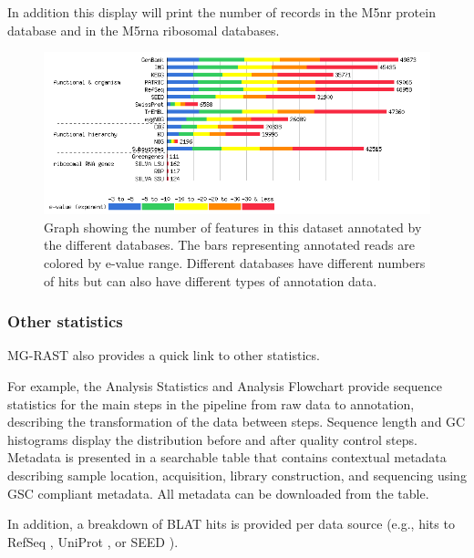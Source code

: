 \documentclass[12pt,fullpage]{report}
\begin{document}
In addition this display will print the number of records in the M5nr protein database and in the M5rna ribosomal databases. 

\begin{figure}
\begin{center}
\includegraphics[width=6in]{Images/source-hits-distribution.png}
\end{center}
\caption{Graph showing the number of features in this dataset annotated by the different databases.
 The bars representing annotated reads are colored by e-value range. Different databases have different numbers of hits but can also have different types of annotation data.}
\label{fig:source-hits-distribution}
\end{figure}
\subsubsection{Other statistics }

MG-RAST also provides a quick link to other statistics.

\noindent For example, the Analysis Statistics and Analysis Flowchart provide sequence statistics for the main steps in the pipeline from raw data to annotation, describing the transformation of the data between steps.
Sequence length and GC histograms display the distribution before and after quality control steps.
Metadata is presented in a searchable table that contains contextual metadata describing sample location, acquisition, library construction, and sequencing using GSC compliant metadata. All metadata can be downloaded from the table.

In addition, 
a breakdown of BLAT hits is provided  per data source (e.g., hits to RefSeq \cite{REFSEQ}, UniProt \cite{UNIPROT}, or \gls{SEED} \cite{SUBSYSTEMS}).
\end{document}
